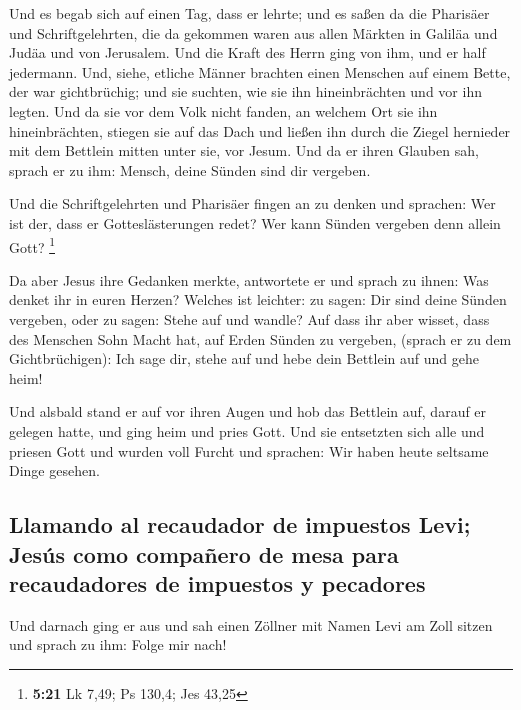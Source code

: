  Und es begab sich auf einen Tag, dass er lehrte; und es
saßen da die Pharisäer und Schriftgelehrten, die da gekommen waren aus
allen Märkten in Galiläa und Judäa und von Jerusalem. Und die Kraft des
Herrn ging von ihm, und er half jedermann.  Und, siehe,
etliche Männer brachten einen Menschen auf einem Bette, der war
gichtbrüchig; und sie suchten, wie sie ihn hineinbrächten und vor ihn
legten.  Und da sie vor dem Volk nicht fanden, an welchem
Ort sie ihn hineinbrächten, stiegen sie auf das Dach und ließen ihn
durch die Ziegel hernieder mit dem Bettlein mitten unter sie, vor Jesum.
 Und da er ihren Glauben sah, sprach er zu ihm: Mensch,
deine Sünden sind dir vergeben.

 Und die Schriftgelehrten und Pharisäer fingen an zu
denken und sprachen: Wer ist der, dass er Gotteslästerungen redet? Wer
kann Sünden vergeben denn allein Gott? \footnote{\textbf{5:21} Lk 7,49;
  Ps 130,4; Jes 43,25}

 Da aber Jesus ihre Gedanken merkte, antwortete er und
sprach zu ihnen: Was denket ihr in euren Herzen?  Welches
ist leichter: zu sagen: Dir sind deine Sünden vergeben, oder zu sagen:
Stehe auf und wandle?  Auf dass ihr aber wisset, dass des
Menschen Sohn Macht hat, auf Erden Sünden zu vergeben, (sprach er zu dem
Gichtbrüchigen): Ich sage dir, stehe auf und hebe dein Bettlein auf und
gehe heim!

 Und alsbald stand er auf vor ihren Augen und hob das
Bettlein auf, darauf er gelegen hatte, und ging heim und pries Gott.
 Und sie entsetzten sich alle und priesen Gott und wurden
voll Furcht und sprachen: Wir haben heute seltsame Dinge gesehen.

\hypertarget{llamando-al-recaudador-de-impuestos-levi-jesuxfas-como-compauxf1ero-de-mesa-para-recaudadores-de-impuestos-y-pecadores}{%
\subsection{Llamando al recaudador de impuestos Levi; Jesús como
compañero de mesa para recaudadores de impuestos y
pecadores}\label{llamando-al-recaudador-de-impuestos-levi-jesuxfas-como-compauxf1ero-de-mesa-para-recaudadores-de-impuestos-y-pecadores}}

 Und darnach ging er aus und sah einen Zöllner mit Namen
Levi am Zoll sitzen und sprach zu ihm: Folge mir nach!

